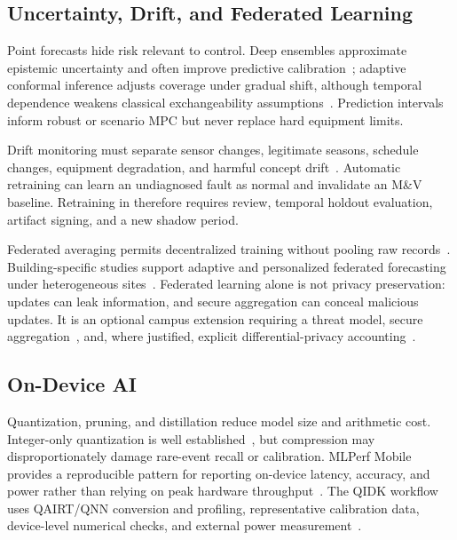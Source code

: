 \subsection{Uncertainty, Drift, and Federated Learning}

Point forecasts hide risk relevant to control. Deep ensembles approximate epistemic uncertainty and often improve predictive calibration~\cite{lakshminarayanan2017ensembles}; adaptive conformal inference adjusts coverage under gradual shift, although temporal dependence weakens classical exchangeability assumptions~\cite{gibbs2021conformal}. Prediction intervals inform robust or scenario MPC but never replace hard equipment limits.

Drift monitoring must separate sensor changes, legitimate seasons, schedule changes, equipment degradation, and harmful concept drift~\cite{gama2014drift,bifet2007adwin}. Automatic retraining can learn an undiagnosed fault as normal and invalidate an M\&V baseline. Retraining in \system{} therefore requires review, temporal holdout evaluation, artifact signing, and a new shadow period.

Federated averaging permits decentralized training without pooling raw records~\cite{mcmahan2017fedavg}. Building-specific studies support adaptive and personalized federated forecasting under heterogeneous sites~\cite{wang2023federated,wang2024personalized}. Federated learning alone is not privacy preservation: updates can leak information, and secure aggregation can conceal malicious updates. It is an optional campus extension requiring a threat model, secure aggregation~\cite{bonawitz2017secureagg}, and, where justified, explicit differential-privacy accounting~\cite{dwork2006dp}.

\subsection{On-Device AI}

Quantization, pruning, and distillation reduce model size and arithmetic cost. Integer-only quantization is well established~\cite{jacob2018quantization}, but compression may disproportionately damage rare-event recall or calibration. MLPerf Mobile provides a reproducible pattern for reporting on-device latency, accuracy, and power rather than relying on peak hardware throughput~\cite{reddi2022mlperfmobile}. The QIDK workflow uses QAIRT/QNN conversion and profiling, representative calibration data, device-level numerical checks, and external power measurement~\cite{qualcomm_aihub_quant,qualcomm_aihub_profile}.

